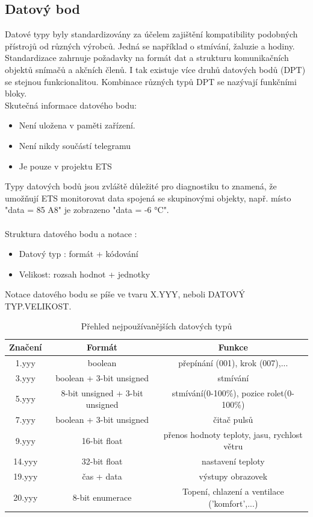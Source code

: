 \subsection{Datový bod}
Datové typy byly standardizovány za účelem zajištění kompatibility podobných přístrojů od různých výrobců. Jedná se například o stmívání, žaluzie a hodiny. Standardizace zahrnuje požadavky na formát dat a strukturu komunikačních objektů snímačů a akčních členů. I tak existuje více druhů datových bodů (DPT) se stejnou funkcionalitou. Kombinace různých typů DPT se nazývají funkčními bloky.\cite{Celkovy prehled}
\\Skutečná informace datového bodu:
\begin{itemize}
    \item Není uložena v paměti zařízení.
    \item Není nikdy součástí telegramu
    \item Je pouze v projektu ETS\\
\end{itemize}
Typy datových bodů jsou zvláště důležité pro diagnostiku to znamená, že umožňují ETS monitorovat data spojená se skupinovými objekty, např. místo "data = 85 A8" je zobrazeno "data = -6 °C". \cite{Datapoint}\\
\\Struktura datového bodu a notace \cite{Datapoint}:
\begin{itemize}
    \item Datový typ : formát + kódování
    \item Velikost: rozsah hodnot + jednotky
\end{itemize}
Notace datového bodu se píše ve tvaru X.YYY, neboli DATOVÝ TYP.VELIKOST.

\begin{table}[h]
 \caption[Přehled nejpoužívanějších datových typů]{Přehled nejpoužívanějších datových typů}
   \small
    \centering
	  \begin{tabular}{|c|c|c|}
	    \hline
	    Značení & Formát  & Funkce  \\
	    \hline\hline
	    1.yyy & boolean & přepínání (001), krok (007),... \\
	    \hline
	    3.yyy & boolean + 3-bit unsigned & stmívání \\
	    \hline
	    5.yyy & 8-bit unsigned + 3-bit unsigned & stmívání(0-100\%), pozice rolet(0-100\%)\\
	    \hline
	    7.yyy & boolean + 3-bit unsigned & čitač pulsů \\
	    \hline
	    9.yyy & 16-bit float & přenos hodnoty teploty, jasu, rychlost větru \\
	    \hline
	    14.yyy & 32-bit float & nastavení teploty\\
	    \hline
	    19.yyy & čas + data & výstupy obrazovek \\
	    \hline
	    20.yyy & 8-bit enumerace & Topení, chlazení a ventilace ('komfort',...) \\
	    \hline
	  \end{tabular}
\end{table}

